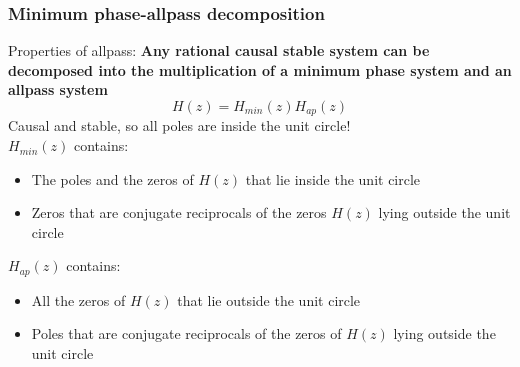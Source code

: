     \subsubsection{Minimum phase-allpass decomposition}
    Properties of allpass: \textbf{Any rational causal stable system can be decomposed into the multiplication of a minimum phase system and an allpass system}
    $$
    H(z)=H_{min}(z)H_{ap}(z)
    $$
    Causal and stable, so all poles are inside the unit circle!\\
    $H_{min}(z)$ contains:
    \begin{itemize}
        \item The poles and the zeros of $H(z)$ that lie inside the unit circle
        \item Zeros that are conjugate reciprocals of the zeros $H(z)$ lying outside the unit circle
    \end{itemize}
    $H_{ap}(z)$ contains:
    \begin{itemize}
        \item All the zeros of $H(z)$ that lie outside the unit circle
        \item Poles that are conjugate reciprocals of the zeros of $H(z)$ lying outside the unit circle
    \end{itemize}
